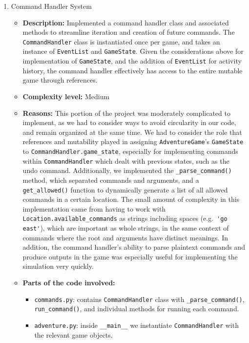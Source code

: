 \documentclass[11pt]{article}
\begin{document}
\begin{enumerate}
\begin{itemize}
        \item \textbf{Demo commands:}
\begin{verbatim}
enhancement2_demo = ['go north', 'go west', 'go west', 'enter wallberg',
                     'take usb drive', 'save']
\end{verbatim}
    \end{itemize}

    \item Command Handler System
    \begin{itemize}
        \item \textbf{Description:} Implemented a command handler class and associated methods to streamline iteration and creation of future commands. The \verb|CommandHandler| class is instantiated once per game, and takes an instance of \verb|EventList| and \verb|GameState|. Given the considerations above for implementation of \verb|GameState|, and the addition of \verb|EventList| for activity history, the command handler effectively has access to the entire mutable game through references.

        \item \textbf{Complexity level:} Medium

        \item \textbf{Reasons:} This portion of the project was moderately complicated to implement, as we had to consider ways to avoid circularity in our code, and remain organized at the same time. We had to consider the role that references and mutability played in assigning \verb|AdventureGame|'s \verb|GameState| to \verb|CommandHandler.game_state|, especially for implementing commands within \verb|CommandHandler| which dealt with previous states, such as the undo command. Additionally, we implemented the \verb|_parse_command()| method, which separated commands and arguments, and a \verb|get_allowed()| function to dynamically generate a list of all allowed commands in a certain location. The small amount of complexity in this implementation came from having to work with \verb|Location.available_commands| as strings including spaces (e.g.\ \verb|'go east'|), which are important as whole strings, in the same context of commands where the root and arguments have distinct meanings. In addition, the command handler's ability to parse plaintext commands and produce outputs in the game was especially useful for implementing the simulation very quickly.

        \item \textbf{Parts of the code involved:}
        \begin{itemize}
            \item \verb|commands.py|: contains \verb|CommandHandler| class with \verb|_parse_command()|, \verb|run_command()|, and individual methods for running each command.
            \item \verb|adventure.py|: inside \verb|__main__| we instantiate \verb|CommandHandler| with the relevant game objects.
        \end{itemize}


\end{itemize}
\end{enumerate}
\end{document}
